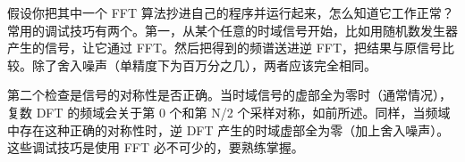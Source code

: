 \begin{Shaded}
\begin{Highlighting}[]
 \OperatorTok{(}\OperatorTok{*}\OperatorTok{,}\OperatorTok{*}\OperatorTok{,} \OperatorTok{)}
\OperatorTok{\{}
     \OperatorTok{(}\OperatorTok{=} \OperatorTok{;}\OperatorTok{\textless{}}\OperatorTok{;}\OperatorTok{++)}                 
\OperatorTok{[}\OperatorTok{]} \OperatorTok{=} \OperatorTok{{-}}\OperatorTok{[}\OperatorTok{];}

\OperatorTok{(}\OperatorTok{,}\OperatorTok{,}\OperatorTok{);}                           

     \OperatorTok{(}\OperatorTok{=} \OperatorTok{;}\OperatorTok{\textless{}}\OperatorTok{;}\OperatorTok{++)} \OperatorTok{\{}               
\OperatorTok{[}\OperatorTok{]} \OperatorTok{=}\OperatorTok{[}\OperatorTok{]} \OperatorTok{/}\OperatorTok{;}
\OperatorTok{[}\OperatorTok{]} \OperatorTok{=} \OperatorTok{{-}}\OperatorTok{[}\OperatorTok{]} \OperatorTok{/}\OperatorTok{;}
    \OperatorTok{\}}
\OperatorTok{\}}
\end{Highlighting}
\end{Shaded}

假设你把其中一个 FFT
算法抄进自己的程序并运行起来，怎么知道它工作正常？常用的调试技巧有两个。第一，从某个任意的时域信号开始，比如用随机数发生器产生的信号，让它通过
FFT。然后把得到的频谱送进逆
FFT，把结果与原信号比较。除了舍入噪声（单精度下为百万分之几），两者应该完全相同。

第二个检查是信号的对称性是否正确。当时域信号的虚部全为零时（通常情况），复数
DFT 的频域会关于第 0 个和第 N/2
个采样对称，如前所述。同样，当频域中存在这种正确的对称性时，逆 DFT
产生的时域虚部全为零（加上舍入噪声）。这些调试技巧是使用 FFT
必不可少的，要熟练掌握。

